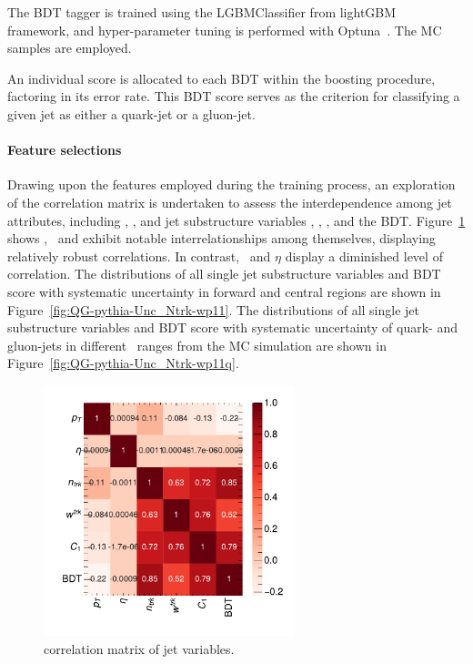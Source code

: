 The BDT tagger is trained using the LGBMClassifier from lightGBM~\cite{NIPS2017_6449f44a} framework, and hyper-parameter tuning is performed with Optuna~\cite{akiba2019optuna}. The MC \pythia samples are employed.

An individual score is allocated to each BDT within the boosting procedure, factoring in its error rate.  This BDT score serves as the criterion for classifying a given jet as either a quark-jet or a gluon-jet. 

\paragraph{Feature selections}\mbox{}\par
Drawing upon the features employed during the training process, an exploration of the correlation matrix is undertaken to assess the interdependence among jet attributes, including \pt, \abseta, and jet substructure variables \ntrk, \wtrk, \cbeta, and the BDT. Figure~\ref{fig:weighted_corr} shows \ntrk, \wtrk~and \cbeta exhibit notable interrelationships among themselves, displaying relatively robust correlations. In contrast, \pt~and $\eta$ display a diminished level of correlation. The distributions of all single jet substructure variables and BDT score with systematic uncertainty in forward and central regions are shown in Figure~\ref{fig:QG-pythia-Unc_Ntrk-wp11}. The distributions of all single jet substructure variables and BDT score with systematic uncertainty of quark- and gluon-jets in different \pt~ranges from the MC simulation are shown in Figure~\ref{fig:QG-pythia-Unc_Ntrk-wp11q}.

\begin{figure}[htb]
	\centering
	\includegraphics[width=0.65\textwidth]{fig/ADE/new_GBDT/corr.pdf}
	\caption{correlation matrix of jet variables.}
	\label{fig:weighted_corr}
\end{figure}

